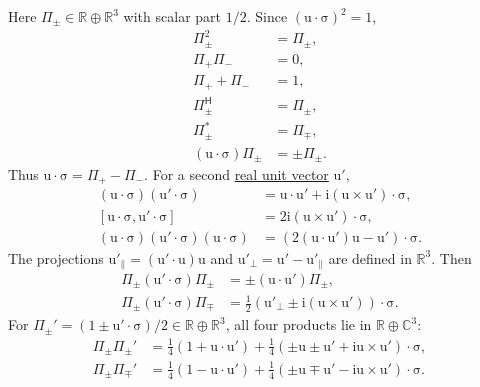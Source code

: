 \documentclass[11pt]{article}
\newcommand{\pvGreek}[1]{{#1}}
\newcommand{\vstyle}[1]{{\bm{\mathrm{#1}}}}
\newcommand{\pvPi}{\pvGreek{\Pi}}
\numberwithin{equation}{section}
\newcommand{\R}{\mathbb{R}}
\newcommand{\C}{\mathbb{C}}
\newcommand{\ii}{\mathrm{i}}
\newcommand{\dotprod}{\cdot}
\newcommand{\bsig}{\vstyle{\sigma}}
\newcommand{\bu}{\vstyle{u}}
\begin{document}
Here $\pvPi_\pm\in\R\oplus\R^3$ with scalar part $1/2$.
Since $(\bu\dotprod\bsig)^2=1$,
\begin{align*}
 \pvPi_\pm^2&=\pvPi_\pm,\\
 \pvPi_+\pvPi_-&=0,\\
 \pvPi_++\pvPi_-&=1,\\
 \pvPi_\pm^{\mathsf H}&=\pvPi_\pm,\\
 \pvPi_\pm^*&=\pvPi_\mp,\\
 (\bu\dotprod\bsig)\pvPi_\pm&=\pm \pvPi_\pm.
\end{align*}
Thus $\bu\dotprod\bsig=\pvPi_+-\pvPi_-$.  For a second
\hyperref[def:real-unit-vector]{real unit vector} $\bu'$,
\begin{align*}
 (\bu\dotprod\bsig)(\bu'\dotprod\bsig)
 &=\bu\dotprod\bu'+\ii(\bu\times\bu')\dotprod\bsig,\\
 [\bu\dotprod\bsig,\bu'\dotprod\bsig]
 &=2\ii(\bu\times\bu')\dotprod\bsig,\\
 (\bu\dotprod\bsig)(\bu'\dotprod\bsig)(\bu\dotprod\bsig)
 &=(2(\bu\dotprod\bu')\bu-\bu')\dotprod\bsig.
\end{align*}
The projections $\bu'_{\parallel}=(\bu'\dotprod\bu)\bu$ and
$\bu'_{\perp}=\bu'-\bu'_{\parallel}$ are defined in $\R^3$.  Then
\begin{align*}
 \pvPi_\pm(\bu'\dotprod\bsig)\pvPi_\pm
 &=\pm(\bu\dotprod\bu')\pvPi_\pm,\\
 \pvPi_\pm(\bu'\dotprod\bsig)\pvPi_\mp
 &=\tfrac12(\bu'_{\perp}\pm\ii(\bu\times\bu'))\dotprod\bsig.
\end{align*}
For $\pvPi_\pm'=(1\pm\bu'\dotprod\bsig)/2\in\R\oplus\R^3$, all four products lie in $\R\oplus\C^3$:
\begin{align*}
 \pvPi_\pm\pvPi_\pm'&=\tfrac14(1+\bu\dotprod\bu')
 +\tfrac14(\pm\bu\pm\bu'+\ii\bu\times\bu')\dotprod\bsig,\\
 \pvPi_\pm\pvPi_\mp'&=\tfrac14(1-\bu\dotprod\bu')
 +\tfrac14(\pm\bu\mp\bu'-\ii\bu\times\bu')\dotprod\bsig.
\end{align*}
\end{document}
